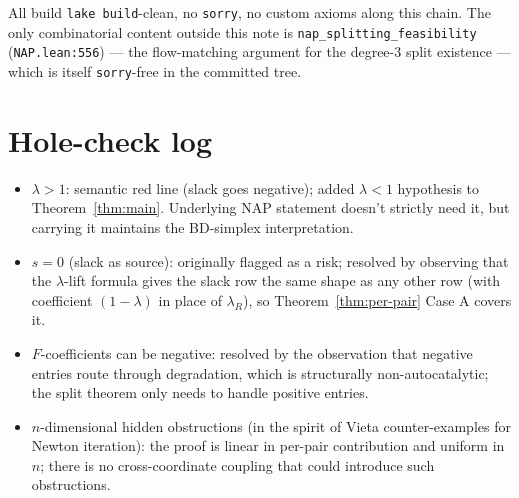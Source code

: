 \documentclass[11pt]{article}
\newcommand{\slack}{0}
\begin{document}
All build \texttt{lake build}-clean, no \verb|sorry|, no custom axioms along
this chain. The only combinatorial content outside this note is
\verb|nap_splitting_feasibility| (\texttt{NAP.lean:556}) — the flow-matching
argument for the degree-$3$ split existence — which is itself
\verb|sorry|-free in the committed tree.

\section{Hole-check log}

\begin{itemize}
  \item $\lambda > 1$: semantic red line (slack goes negative); added
    $\lambda < 1$ hypothesis to Theorem~\ref{thm:main}. Underlying NAP
    statement doesn't strictly need it, but carrying it maintains the
    BD-simplex interpretation.
  \item $s = \slack$ (slack as source): originally flagged as a risk;
    resolved by observing that the $\lambda$-lift formula gives the slack
    row the same shape as any other row (with coefficient $(1-\lambda)$
    in place of $\lambda_R$), so Theorem~\ref{thm:per-pair} Case A covers it.
  \item $F$-coefficients can be negative: resolved by the observation that
    negative entries route through degradation, which is structurally
    non-autocatalytic; the split theorem only needs to handle positive
    entries.
  \item $n$-dimensional hidden obstructions (in the spirit of Vieta
    counter-examples for Newton iteration): the proof is linear in
    per-pair contribution and uniform in $n$; there is no cross-coordinate
    coupling that could introduce such obstructions.
\end{itemize}
\end{document}
